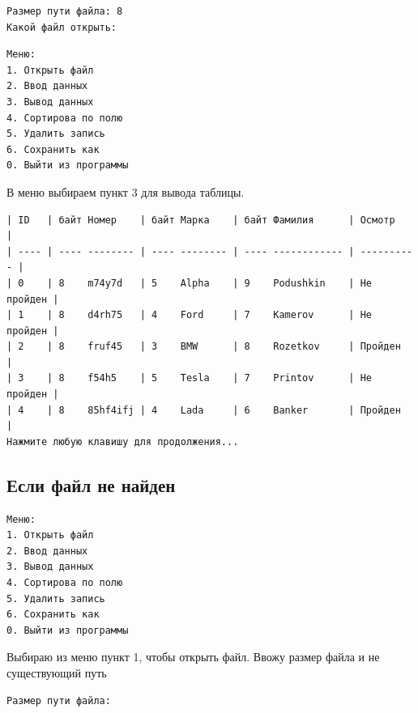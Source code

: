 \begin{tcolorbox}
\begin{verbatim}
Размер пути файла: 8
Какой файл открыть: 
\end{verbatim}
\end{tcolorbox}

\begin{tcolorbox}
\begin{verbatim}
Меню:
1. Открыть файл      
2. Ввод данных       
3. Вывод данных      
4. Сортирова по полю 
5. Удалить запись    
6. Сохранить как     
0. Выйти из программы
\end{verbatim}
\end{tcolorbox}

В меню выбираем пункт 3 для вывода таблицы.

\begin{tcolorbox}
\begin{verbatim}
| ID   | байт Номер    | байт Марка    | байт Фамилия      | Осмотр     |
| ---- | ---- -------- | ---- -------- | ---- ------------ | ---------- |
| 0    | 8    m74y7d   | 5    Alpha    | 9    Podushkin    | Не пройден |
| 1    | 8    d4rh75   | 4    Ford     | 7    Kamerov      | Не пройден |
| 2    | 8    fruf45   | 3    BMW      | 8    Rozetkov     | Пройден    |
| 3    | 8    f54h5    | 5    Tesla    | 7    Printov      | Не пройден |
| 4    | 8    85hf4ifj | 4    Lada     | 6    Banker       | Пройден    |
Нажмите любую клавишу для продолжения...
\end{verbatim}
\end{tcolorbox}

\newpage

\subsection{Если файл не найден}

\begin{tcolorbox}
\begin{verbatim}
Меню:
1. Открыть файл      
2. Ввод данных       
3. Вывод данных      
4. Сортирова по полю 
5. Удалить запись    
6. Сохранить как     
0. Выйти из программы
\end{verbatim}
\end{tcolorbox}

Выбираю из меню пункт 1, чтобы открыть файл. Ввожу размер файла и не существующий путь

\begin{tcolorbox}
\begin{verbatim}
Размер пути файла: 
\end{verbatim}
\end{tcolorbox}

